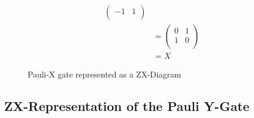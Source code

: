 \begin{figure}[h]
\begin{align*}
\begin{pmatrix}
            -1 & 1  \\
        \end{pmatrix}                                                                                                                                                \\
         & =
        \begin{pmatrix}
            0 & 1 \\
            1 & 0 \\
        \end{pmatrix}                                                                                                                                                \\
         & = X
    \end{align*}
    \caption{Pauli-X gate represented as a ZX-Diagram}
\end{figure}

\subsection{ZX-Representation of the Pauli Y-Gate}
\label{appendix:pauli-y-gate-as-spider}

